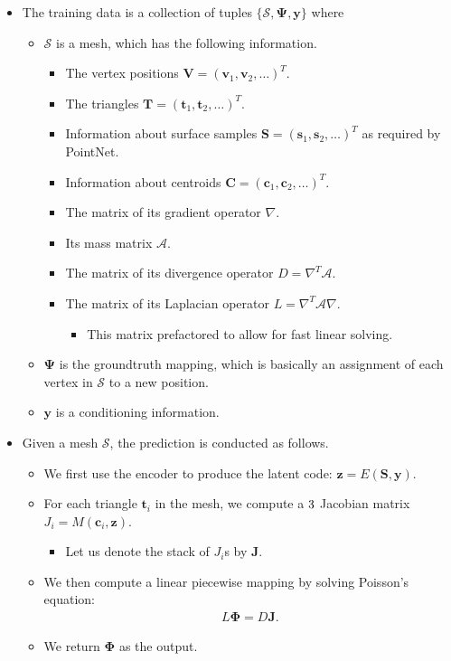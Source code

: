 \documentclass[10pt]{article}
\newcommand{\ve}[1]{\mathbf{#1}}
\newcommand{\ves}[1]{\boldsymbol{#1}}
\newcommand{\mcal}[1]{\mathcal{#1}}
\begin{document}
\begin{itemize}
    \item The training data is a collection of tuples $\{ \mcal{S}, \ves{\Psi}, \ve{y} \}$ where
    \begin{itemize}
        \item $\mcal{S}$ is a mesh, which has the following information.
        \begin{itemize}
            \item The vertex positions $\ve{V} = (\ve{v}_1, \ve{v}_2, \dotsc)^T$.
            \item The triangles $\ve{T} = (\ve{t}_1, \ve{t}_2, \dotsc)^T$.
            \item Information about surface samples $\ve{S} = (\ve{s}_1, \ve{s}_2, \dotsc)^T$ as required by PointNet.
            \item Information about centroids $\ve{C} = (\ve{c}_1, \ve{c}_2, \dotsc)^T$.
            \item The matrix of its gradient operator $\nabla$.
            \item Its mass matrix $\mcal{A}$.
            \item The matrix of its divergence operator $D = \nabla^T \mcal{A}$.
            \item The matrix of its Laplacian operator $L = \nabla^T \mcal{A} \nabla$.
            \begin{itemize}
                \item This matrix prefactored to allow for fast linear solving.
            \end{itemize}
        \end{itemize}
        \item $\ves{\Psi}$ is the groundtruth mapping, which is basically an assignment of each vertex in $\mcal{S}$ to a new position.
        \item $\ve{y}$ is a conditioning information.
    \end{itemize}

    \item Given a mesh $\mcal{S}$, the prediction is conducted as follows.
    \begin{itemize}
        \item We first use the encoder to produce the latent code: $\ve{z} = E(\ve{S}, \ve{y})$.
        \item For each triangle $\ve{t}_i$ in the mesh, we compute a $3\time3$ Jacobian matrix $J_i = M(\ve{c}_i, \ve{z})$.
        \begin{itemize}
            \item Let us denote the stack of $J_i$s by $\ve{J}$.
        \end{itemize}
        \item We then compute a linear piecewise mapping by solving Poisson's equation:
        \begin{align*}
                L \ves{\Phi} = D \ve{J}.
        \end{align*}
        \item We return $\ves{\Phi}$ as the output.
    \end{itemize}


\end{itemize}
\end{document}
